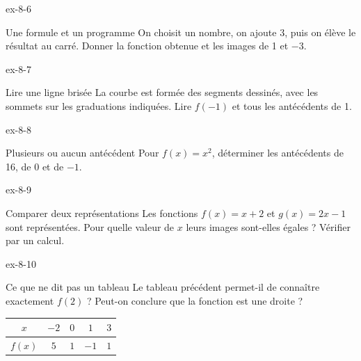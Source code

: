 \clearpage{}
\begin{blocLivre}{ex-8-6}\begin{exercice}[2]{Une formule et un programme}
On choisit un nombre, on ajoute 3, puis on élève le résultat au carré. Donner la fonction obtenue et les images de 1 et $-3$.
\end{exercice}\end{blocLivre}
\begin{blocLivre}{ex-8-7}\begin{exercice}[2]{Lire une ligne brisée}
La courbe est formée des segments dessinés, avec les sommets sur les graduations indiquées. Lire $f(-1)$ et tous les antécédents de 1.
\label{fig-ex-8-7}
\end{exercice}\end{blocLivre}
\begin{blocLivre}{ex-8-8}\begin{exercice}[2]{Plusieurs ou aucun antécédent}
Pour $f(x)=x^2$, déterminer les antécédents de 16, de 0 et de $-1$.
\label{fig-ex-8-8}
\end{exercice}\end{blocLivre}
\begin{blocLivre}{ex-8-9}\begin{exercice}[2]{Comparer deux représentations}
Les fonctions $f(x)=x+2$ et $g(x)=2x-1$ sont représentées. Pour quelle valeur de $x$ leurs images sont-elles égales ? Vérifier par un calcul.
\label{fig-ex-8-9}
\end{exercice}\end{blocLivre}
\begin{blocLivre}{ex-8-10}\begin{exercice}[2]{Ce que ne dit pas un tableau}
Le tableau précédent permet-il de connaître exactement $f(2)$ ? Peut-on conclure que la fonction est une droite ?\begin{center}\renewcommand{\arraystretch}{1.35}\begin{tabular}{c|cccc}\toprule
$x$ & $-2$ & $0$ & $1$ & $3$\\\midrule
$f(x)$ & $5$ & $1$ & $-1$ & $1$\\
\bottomrule\end{tabular}\end{center}
\end{exercice}\end{blocLivre}

